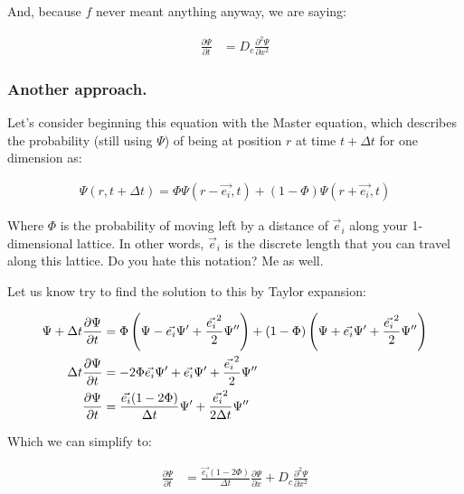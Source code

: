 And, because $f$ never meant anything anyway, we are saying: 

\begin{equation}
\begin{split} \label{sec:diffequation}
    \frac{\partial \Psi}{\partial t} & = D_c \frac{\partial^2 \Psi}{\partial x^2} 
\end{split}
\end{equation}


\subsubsection{Another approach.}

Let's consider beginning this equation with the Master equation, which describes the probability (still using $\Psi$) of being at position $r$ at time $t + \Delta t$ for one dimension as: 

\begin{equation}
\begin{split}
    \Psi(r,t + \Delta t) = \Phi\Psi(r - \Vec{e_i},t) + (1 - \Phi)\Psi(r + \Vec{e_i},t)
\end{split}
\end{equation}

Where $\Phi$ is the probability of moving left by a distance of $\Vec{e}_i$ along your 1-dimensional lattice. In other words, $\Vec{e}_i$ is the discrete length that you can travel along this lattice. Do you hate this notation? Me as well.\newline

Let us know try to find the solution to this by Taylor expansion: 

\begin{equation}
\begin{split}
    \Psi + \Delta t\frac{\partial \Psi}{\partial t} &= \Phi\left(\Psi - \Vec{e_i}\Psi' + \frac{\Vec{e_i}^2}{2}\Psi''\right) + (1 - \Phi)\left(\Psi + \Vec{e_i}\Psi' + \frac{\Vec{e_i}^2}{2}\Psi''\right) \\
    \Delta t\frac{\partial \Psi}{\partial t} &= -2\Phi\Vec{e_i}\Psi' + \Vec{e_i}\Psi' + \frac{\Vec{e_i}^2}{2}\Psi'' \\
    \frac{\partial \Psi}{\partial t} &= \frac{\Vec{e_i}(1-2\Phi)}{\Delta t}\Psi' + \frac{\Vec{e_i}^2}{2\Delta t}\Psi'' \\
\end{split}
\end{equation}

Which we can simplify to: 

\begin{equation}
\begin{split}
    \frac{\partial \Psi}{\partial t} &= \frac{\Vec{e_i}(1-2\Phi)}{\Delta t}\frac{\partial \Psi}{\partial x} + D_c\frac{\partial^2 \Psi}{\partial x^2} \\
\end{split}
\end{equation}


